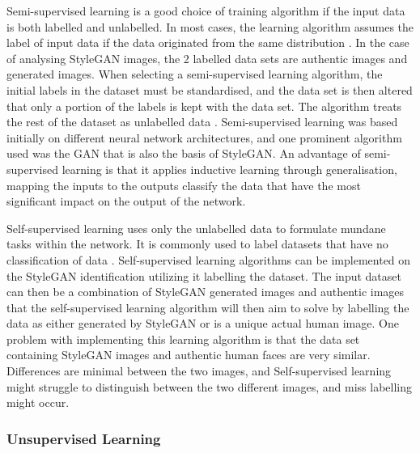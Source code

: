Semi-supervised learning is a good choice of training algorithm if the input data is both labelled and unlabelled. In most cases, the learning algorithm assumes the label of input data if the data originated from the same distribution \citep{Zhai}. In the case of analysing StyleGAN images, the 2 labelled data sets are authentic images and generated images. When selecting a semi-supervised learning algorithm, the initial labels in the dataset must be standardised, and the data set is then altered that only a portion of the labels is kept with the data set. The algorithm treats the rest of the dataset as unlabelled data \citep{Zhai}. Semi-supervised learning was based initially on different neural network architectures, and one prominent algorithm used was the GAN that is also the basis of StyleGAN. An advantage of semi-supervised learning is that it applies inductive learning through generalisation, mapping the inputs to the outputs classify the data that have the most significant impact on the output of the network. 

Self-supervised learning uses only the unlabelled data to formulate mundane tasks within the network. It is commonly used to label datasets that have no classification of data \citep{Zhai}. Self-supervised learning algorithms can be implemented on the StyleGAN identification utilizing it labelling the dataset. The input dataset can then be a combination of StyleGAN generated images and authentic images that the self-supervised learning algorithm will then aim to solve by labelling the data as either generated by StyleGAN or is a unique actual human image. One problem with implementing this learning algorithm is that the data set containing StyleGAN images and authentic human faces are very similar. Differences are minimal between the two images, and Self-supervised learning might struggle to distinguish between the two different images, and miss labelling might occur. 

\subsubsection{Unsupervised Learning}

